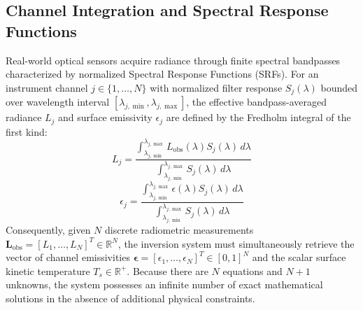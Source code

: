 \documentclass[journal]{IEEEtran}
\begin{document}
\subsection{Channel Integration and Spectral Response Functions}
Real-world optical sensors acquire radiance through finite spectral bandpasses characterized by normalized Spectral Response Functions (SRFs). For an instrument channel $j \in \{1, \dots, N\}$ with normalized filter response $S_j(\lambda)$ bounded over wavelength interval $[\lambda_{j,\min}, \lambda_{j,\max}]$, the effective bandpass-averaged radiance $L_j$ and surface emissivity $\epsilon_j$ are defined by the Fredholm integral of the first kind:
\begin{equation}
L_j = \frac{\int_{\lambda_{j,\min}}^{\lambda_{j,\max}} L_{\text{obs}}(\lambda) S_j(\lambda) \, d\lambda}{\int_{\lambda_{j,\min}}^{\lambda_{j,\max}} S_j(\lambda) \, d\lambda}
\label{eq:channel_rad}
\end{equation}
\begin{equation}
\epsilon_j = \frac{\int_{\lambda_{j,\min}}^{\lambda_{j,\max}} \epsilon(\lambda) S_j(\lambda) \, d\lambda}{\int_{\lambda_{j,\min}}^{\lambda_{j,\max}} S_j(\lambda) \, d\lambda}
\label{eq:channel_eps}
\end{equation}
Consequently, given $N$ discrete radiometric measurements $\bm{L}_{\text{obs}} = [L_1, \dots, L_N]^T \in \mathbb{R}^N$, the inversion system must simultaneously retrieve the vector of channel emissivities $\bm{\epsilon} = [\epsilon_1, \dots, \epsilon_N]^T \in [0, 1]^N$ and the scalar surface kinetic temperature $T_s \in \mathbb{R}^+$. Because there are $N$ equations and $N+1$ unknowns, the system possesses an infinite number of exact mathematical solutions in the absence of additional physical constraints.
\end{document}

